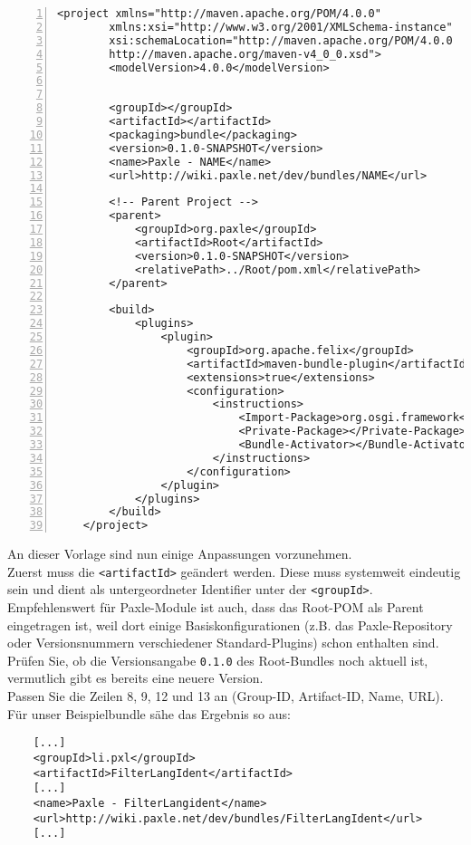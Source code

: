 \documentclass[a4paper,12pt]{scrartcl}
\begin{document}
\begin{lstlisting}[numbers=left, caption=Vorlage für pom.xml unseres FilterLangIdent-Beispielbundle]
	<project xmlns="http://maven.apache.org/POM/4.0.0"
		xmlns:xsi="http://www.w3.org/2001/XMLSchema-instance"
		xsi:schemaLocation="http://maven.apache.org/POM/4.0.0
		http://maven.apache.org/maven-v4_0_0.xsd">
		<modelVersion>4.0.0</modelVersion>
		
		
		<groupId></groupId>
		<artifactId></artifactId>
		<packaging>bundle</packaging>
		<version>0.1.0-SNAPSHOT</version>
		<name>Paxle - NAME</name>
		<url>http://wiki.paxle.net/dev/bundles/NAME</url>
		
		<!-- Parent Project -->
		<parent>
			<groupId>org.paxle</groupId>
			<artifactId>Root</artifactId>
			<version>0.1.0-SNAPSHOT</version>
			<relativePath>../Root/pom.xml</relativePath>
		</parent>
		
		<build>
			<plugins>
				<plugin>
					<groupId>org.apache.felix</groupId>
					<artifactId>maven-bundle-plugin</artifactId>
					<extensions>true</extensions>
					<configuration>
						<instructions>
							<Import-Package>org.osgi.framework</Import-Package>
							<Private-Package></Private-Package>
							<Bundle-Activator></Bundle-Activator>
						</instructions>
					</configuration>
				</plugin>
			</plugins>
		</build>
	</project>
\end{lstlisting}

An dieser Vorlage sind nun einige Anpassungen vorzunehmen.\\
Zuerst muss die \lstinline[breaklines=false, basicstyle=\itshape]|<artifactId>| geändert werden. Diese muss systemweit eindeutig sein und dient als untergeordneter Identifier unter der \lstinline[breaklines=false, basicstyle=\itshape]|<groupId>|.\\
Empfehlenswert für Paxle-Module ist auch, dass das Root-POM als Parent eingetragen ist, weil dort einige Basiskonfigurationen (z.B. das Paxle-Repository oder Versionsnummern verschiedener Standard-Plugins) schon enthalten sind. Prüfen Sie, ob die Versionsangabe \lstinline[breaklines=false, basicstyle=\itshape]|0.1.0| des Root-Bundles noch aktuell ist, vermutlich gibt es bereits eine neuere Version.\\
Passen Sie die Zeilen 8, 9, 12 und 13 an (Group-ID, Artifact-ID, Name, URL).\\
Für unser Beispielbundle sähe das Ergebnis so aus:
\begin{lstlisting}
	[...]
	<groupId>li.pxl</groupId>
	<artifactId>FilterLangIdent</artifactId>
	[...]
	<name>Paxle - FilterLangident</name>
	<url>http://wiki.paxle.net/dev/bundles/FilterLangIdent</url>
	[...]
\end{lstlisting}
\end{document}
